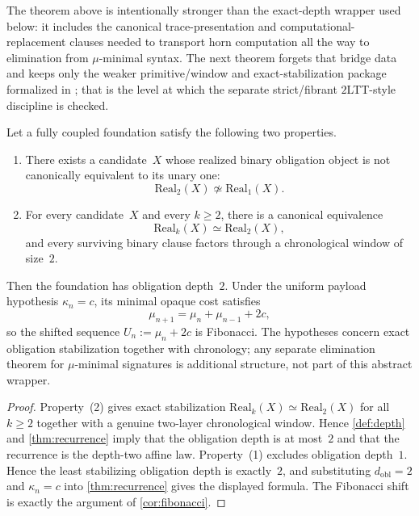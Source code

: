 \documentclass{lmcs}
\newcommand{\Real}{\mathrm{Real}}
\begin{document}
The theorem above is intentionally stronger than the exact-depth wrapper used below: it includes the canonical trace-presentation and computational-replacement clauses needed to transport horn computation all the way to elimination from $\mu$-minimal syntax. The next theorem forgets that bridge data and keeps only the weaker primitive/window and exact-stabilization package formalized in ; that is the level at which the separate strict/fibrant $2$LTT-style discipline is checked.

\begin{thm}
\label{thm:2d-foundations}
Let a fully coupled foundation satisfy the following two properties.
\begin{enumerate}
  \item There exists a candidate~$X$ whose realized binary obligation object is not canonically equivalent to its unary one:
  \[
    \Real_2(X) \not\simeq \Real_1(X).
  \]
  \item For every candidate~$X$ and every $k \geq 2$, there is a canonical equivalence
  \[
    \Real_k(X) \simeq \Real_2(X),
  \]
  and every surviving binary clause factors through a chronological window of size~$2$.
\end{enumerate}
Then the foundation has obligation depth~$2$. Under the uniform payload hypothesis $\kappa_n=c$, its minimal opaque cost satisfies
\[
  \mu_{n+1} = \mu_n + \mu_{n-1} + 2c,
\]
so the shifted sequence $U_n := \mu_n + 2c$ is Fibonacci.
The hypotheses concern exact obligation stabilization together with chronology; any separate elimination theorem for $\mu$-minimal signatures is additional structure, not part of this abstract wrapper.
\end{thm}

\begin{proof}
Property~(2) gives exact stabilization $\Real_k(X) \simeq \Real_2(X)$ for all $k \geq 2$ together with a genuine two-layer chronological window. Hence \autoref{def:depth} and \autoref{thm:recurrence} imply that the obligation depth is at most~$2$ and that the recurrence is the depth-two affine law. Property~(1) excludes obligation depth~$1$. Hence the least stabilizing obligation depth is exactly~$2$, and substituting $d_{\mathrm{obl}}=2$ and $\kappa_n=c$ into \autoref{thm:recurrence} gives the displayed formula. The Fibonacci shift is exactly the argument of \autoref{cor:fibonacci}.
\end{proof}
\end{document}
